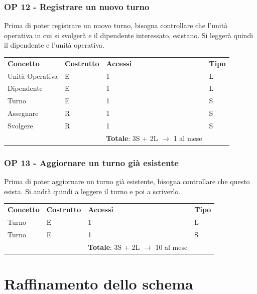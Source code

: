 \documentclass[a4paper, 12pt]{report}
\begin{document}
\subsubsection*{OP 12 - Registrare un nuovo turno}
Prima di poter registrare un nuovo turno, bisogna controllare che l'unità operativa in cui si svolgerà
e il dipendente interessato, esistano. Si leggerà quindi il dipendente e l'unità operativa. \par
\bigskip
\noindent
\begin{tabularx}{\textwidth}{XlXl}
        \rowcolor{seaGreen}
        \textbf{Concetto} & \textbf{Costrutto} & \textbf{Accessi} & \textbf{Tipo} \\
        Unità Operativa & E & 1 & L \\
        \hline
        Dipendente & E & 1 & L \\
        \hline
        Turno & E & 1 & S \\
        \hline
        Assegnare & R & 1 & S \\
        \hline
        Svolgere & R & 1 & S \\
        \rowcolor{seaGreen}
         &  & \textbf{Totale}: 3S + 2L $\rightarrow$ 1 al mese & \\
\end{tabularx}

\subsubsection*{OP 13 - Aggiornare un turno già esistente}
Prima di poter aggiornare un turno già esistente, bisogna controllare che questo esista. Si andrà quindi a
leggere il turno e poi a scriverlo. \par
\bigskip
\noindent
\begin{tabularx}{\textwidth}{XlXl}
        \rowcolor{seaGreen}
        \textbf{Concetto} & \textbf{Costrutto} & \textbf{Accessi} & \textbf{Tipo} \\
        Turno & E & 1 & L \\
        \hline
        Turno & E & 1 & S \\
        \rowcolor{seaGreen}
         &  & \textbf{Totale}: 3S + 2L $\rightarrow$ 10 al mese & \\
\end{tabularx}

\newpage
\section{Raffinamento dello schema}
\end{document}
